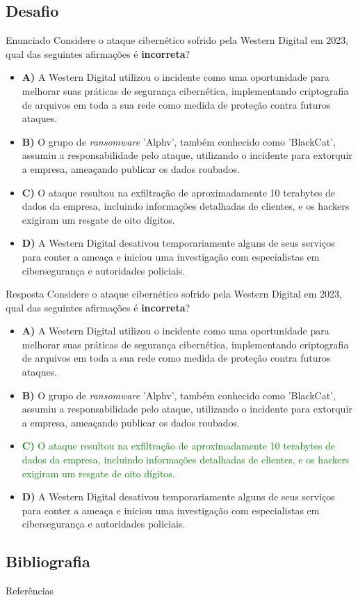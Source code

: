 \documentclass[bookmarks=false,aspectratio=169,9pt]{beamer}
\begin{document}
\subsection{Desafio}
\begin{frame}{Enunciado}
	Considere o ataque cibernético sofrido pela Western Digital em 2023, qual das seguintes afirmações é \textbf{incorreta}?
	\begin{itemize}
		\item \textbf{A)} A Western Digital utilizou o incidente como uma oportunidade para melhorar suas práticas de segurança cibernética, implementando criptografia de arquivos em toda a sua rede como medida de proteção contra futuros ataques.
		\item \textbf{B)} O grupo de \textit{ransomware} 'Alphv', também conhecido como 'BlackCat', assumiu a responsabilidade pelo ataque, utilizando o incidente para extorquir a empresa, ameaçando publicar os dados roubados.
		\item \textbf{C)} O ataque resultou na exfiltração de aproximadamente 10 terabytes de dados da empresa, incluindo informações detalhadas de clientes, e os hackers exigiram um resgate de oito dígitos.
		\item \textbf{D)} A Western Digital desativou temporariamente alguns de seus serviços para conter a ameaça e iniciou uma investigação com especialistas em cibersegurança e autoridades policiais.
	\end{itemize}
\end{frame}
\begin{frame}{Resposta}
	Considere o ataque cibernético sofrido pela Western Digital em 2023, qual das seguintes afirmações é \textbf{incorreta}?
	\begin{itemize}
		\item \textbf{A)} A Western Digital utilizou o incidente como uma oportunidade para melhorar suas práticas de segurança cibernética, implementando criptografia de arquivos em toda a sua rede como medida de proteção contra futuros ataques.
		\item \textbf{B)} O grupo de \textit{ransomware} 'Alphv', também conhecido como 'BlackCat', assumiu a responsabilidade pelo ataque, utilizando o incidente para extorquir a empresa, ameaçando publicar os dados roubados.
		\item \textcolor{green}{\textbf{C)} O ataque resultou na exfiltração de aproximadamente 10 terabytes de dados da empresa, incluindo informações detalhadas de clientes, e os hackers exigiram um resgate de oito dígitos.}
		\item \textbf{D)} A Western Digital desativou temporariamente alguns de seus serviços para conter a ameaça e iniciou uma investigação com especialistas em cibersegurança e autoridades policiais.
	\end{itemize}
\end{frame}
\subsection{Bibliografia}
\begin{frame}{Referências}
	\printbibliography
\end{frame}
\end{document}
